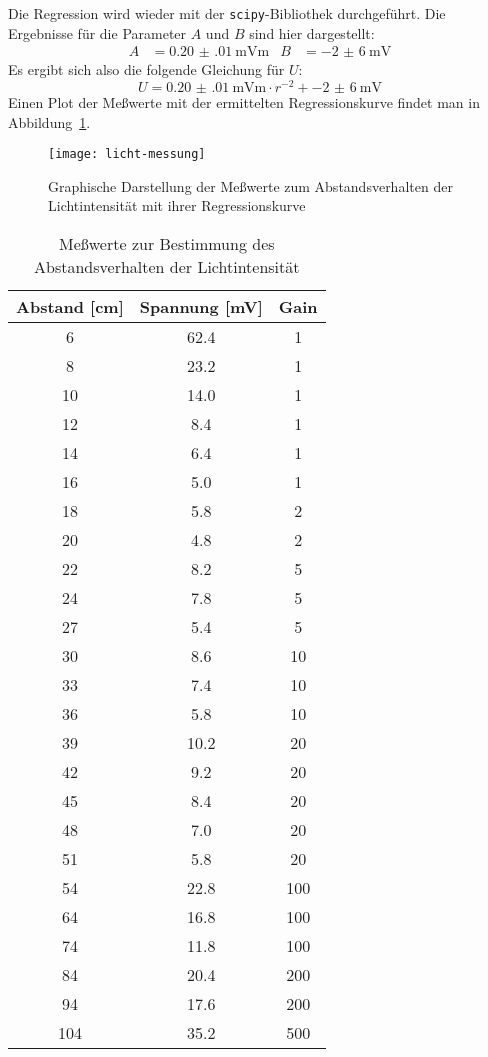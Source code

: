 Die Regression wird wieder mit der \texttt{scipy}-Bibliothek
durchgeführt. Die Ergebnisse für die Parameter $A$ und $B$ sind hier
dargestellt:
%
\begin{align}
  A &= \SI{0.20(01)}{\milli\volt\metre} & 
  B &= \SI{-2(6)}{\milli\volt}
\end{align}
%
Es ergibt sich also die folgende Gleichung für $U$:
%
\begin{equation}
  U = \SI{0.20(01)}{\milli\volt\metre} \cdot r^{-2} +
  \SI{-2(6)}{\milli\volt}
\end{equation}
%
Einen Plot der Meßwerte mit der ermittelten Regressionskurve findet man
in Abbildung~\ref{fig:licht-messung}.

\begin{figure}
  \centering
  \texttt{[image: licht-messung]}
  \caption{Graphische Darstellung der Meßwerte zum Abstandsverhalten der
    Lichtintensität mit ihrer Regressionskurve}
  \label{fig:licht-messung}
\end{figure}

\begin{table}
  \centering
  \begin{tabular}{SSS}
    \toprule
    {Abstand [\si{\centi\metre}]} &
    {Spannung [\si{\milli\volt}]} &
    {Gain} \\
     & 62.4 &   1 \\
    8 & 23.2 &   1 \\
    10 & 14.0 &   1 \\
    12 &  8.4 &   1 \\
    14 &  6.4 &   1 \\
    16 &  5.0 &   1 \\
    18 &  5.8 &   2 \\
    20 &  4.8 &   2 \\
    22 &  8.2 &   5 \\
    24 &  7.8 &   5 \\
    27 &  5.4 &   5 \\
    30 &  8.6 &  10 \\
    33 &  7.4 &  10 \\
    36 &  5.8 &  10 \\
    39 & 10.2 &  20 \\
    42 &  9.2 &  20 \\
    45 &  8.4 &  20 \\
    48 &  7.0 &  20 \\
    51 &  5.8 &  20 \\
    54 & 22.8 & 100 \\
    64 & 16.8 & 100 \\
    74 & 11.8 & 100 \\
    84 & 20.4 & 200 \\
    94 & 17.6 & 200 \\
    104 & 35.2 & 500 \\
    \bottomrule
  \end{tabular}
  \caption{Meßwerte zur Bestimmung des Abstandsverhalten 
    der Lichtintensität}
  \label{tab:licht-messung}
\end{table}
